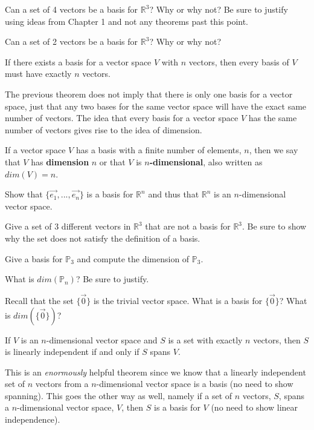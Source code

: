 \bq Can a set of 4 vectors be a basis for $\mathbb{R}^3$? Why or why not? Be sure to justify using ideas from Chapter 1 and not any theorems past this point.
\eq

\bq Can a set of 2 vectors be a basis for $\mathbb{R}^3$? Why or why not?
\eq

\begin{theorem}
If there exists a basis for a vector space $V$ with $n$ vectors, then every basis of $V$ must have exactly $n$ vectors.
\end{theorem}
The previous theorem does not imply that there is only one basis for a vector space, just that any two bases for the same vector space will have the exact same number of vectors. The idea that every basis for a vector space $V$ has the same number of vectors gives rise to the idea of dimension.
\begin{definition} If a vector space $V$ has a basis with a finite number of elements, $n$, then we say that $V$ has \textbf{dimension} $n$ or that $V$ is \textbf{$n$-dimensional}, also written as $dim(V)=n$. \end{definition}

\bq Show that $\{ \vec{e_1}, ... ,\vec{e_n} \}$ is a basis for $\mathbb{R}^n$ and thus that $\mathbb{R}^n$ is an $n$-dimensional vector space.
\eq

\bq Give a set of 3 different vectors in $\mathbb{R}^3$ that are not a basis for $\mathbb{R}^3$. Be sure to show why the set does not satisfy the definition of a basis.
\eq

\bq Give a basis for $\mathbb{P}_3$ and compute the dimension of $\mathbb{P}_3$.
\eq

\bq What is $dim(\mathbb{P}_n)$? Be sure to justify.
\eq

\bq Recall that the set $\{\vec{0} \}$ is the trivial vector space. What is a basis for $\{\vec{0} \}$? What is $dim(\{\vec{0} \})$?
\eq

\begin{theorem}
If $V$ is an $n$-dimensional vector space and $S$ is a set with exactly $n$ vectors, then $S$ is linearly independent if and only if $S$ spans $V$.
\end{theorem}

This is an \emph{enormously} helpful theorem since we know that a linearly independent set of $n$ vectors from a $n$-dimensional vector space is a basis (no need to show spanning). This goes the other way as well, namely if a set of $n$ vectors, $S$, spans a $n$-dimensional vector space, $V$, then $S$ is a basis for $V$ (no need to show linear independence).


